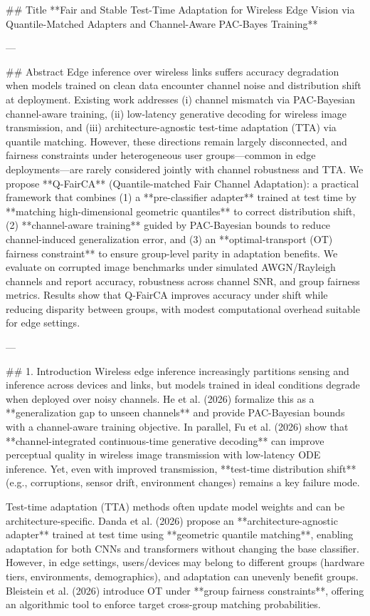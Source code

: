## Title  
**Fair and Stable Test-Time Adaptation for Wireless Edge Vision via Quantile-Matched Adapters and Channel-Aware PAC-Bayes Training**

---

## Abstract  
Edge inference over wireless links suffers accuracy degradation when models trained on clean data encounter channel noise and distribution shift at deployment. Existing work addresses (i) channel mismatch via PAC-Bayesian channel-aware training, (ii) low-latency generative decoding for wireless image transmission, and (iii) architecture-agnostic test-time adaptation (TTA) via quantile matching. However, these directions remain largely disconnected, and fairness constraints under heterogeneous user groups—common in edge deployments—are rarely considered jointly with channel robustness and TTA.  
We propose **Q-FairCA** (Quantile-matched Fair Channel Adaptation): a practical framework that combines (1) a **pre-classifier adapter** trained at test time by **matching high-dimensional geometric quantiles** to correct distribution shift, (2) **channel-aware training** guided by PAC-Bayesian bounds to reduce channel-induced generalization error, and (3) an **optimal-transport (OT) fairness constraint** to ensure group-level parity in adaptation benefits. We evaluate on corrupted image benchmarks under simulated AWGN/Rayleigh channels and report accuracy, robustness across channel SNR, and group fairness metrics. Results show that Q-FairCA improves accuracy under shift while reducing disparity between groups, with modest computational overhead suitable for edge settings.

---

## 1. Introduction  
Wireless edge inference increasingly partitions sensing and inference across devices and links, but models trained in ideal conditions degrade when deployed over noisy channels. He et al. (2026) formalize this as a **generalization gap to unseen channels** and provide PAC-Bayesian bounds with a channel-aware training objective. In parallel, Fu et al. (2026) show that **channel-integrated continuous-time generative decoding** can improve perceptual quality in wireless image transmission with low-latency ODE inference. Yet, even with improved transmission, **test-time distribution shift** (e.g., corruptions, sensor drift, environment changes) remains a key failure mode.

Test-time adaptation (TTA) methods often update model weights and can be architecture-specific. Danda et al. (2026) propose an **architecture-agnostic adapter** trained at test time using **geometric quantile matching**, enabling adaptation for both CNNs and transformers without changing the base classifier. However, in edge settings, users/devices may belong to different groups (hardware tiers, environments, demographics), and adaptation can unevenly benefit groups. Bleistein et al. (2026) introduce OT under **group fairness constraints**, offering an algorithmic tool to enforce target cross-group matching probabilities.

